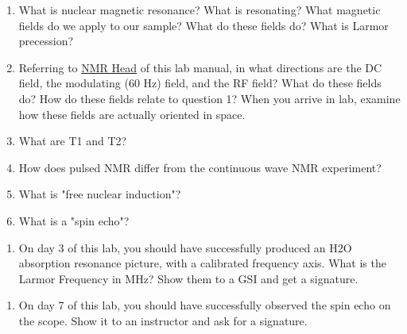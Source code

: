 \documentclass{../signatures}
\begin{document}
\maketitle

\names

\prelab

\begin{enumerate}

    \item What is nuclear magnetic resonance? What is resonating? What magnetic fields do we apply to our sample? What do these fields do? What is Larmor precession?
    
    \item Referring to \href{http://experimentationlab.berkeley.edu/sites/default/files/NMRHead.png}{NMR Head} of this lab manual, in what directions are the DC field, the modulating (60 Hz) field, and the RF field? What do these fields do? How do these fields relate to question 1? When you arrive in lab, examine how these fields are actually oriented in space. 

    \item What are T1 and T2?

    \item How does pulsed NMR differ from the continuous wave NMR experiment?

    \item What is "free nuclear induction"?

    \item What is a "spin echo"?
       \\[36pt]
\end{enumerate}

\prelabsignatures

\pagebreak

\midlab

\begin{enumerate}

    \item On day 3 of this lab, you should have successfully produced an H2O absorption resonance picture, with a calibrated frequency axis. What is the Larmor Frequency in MHz? Show them to a GSI and get a signature.
\\[36pt]
\end{enumerate}


\begin{enumerate}

\item On day 7 of this lab, you should have successfully observed the spin echo on the scope. Show it to an instructor and ask for a signature.
\\[36pt]
\end{enumerate}
\end{document}
